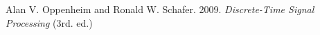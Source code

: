 \documentclass[preview]{standalone}
\begin{document}
\begin{center}
Alan V. Oppenheim and Ronald W. Schafer. 2009. \textit{Discrete-Time Signal Processing} (3rd. ed.)
\end{center}
\end{document}
